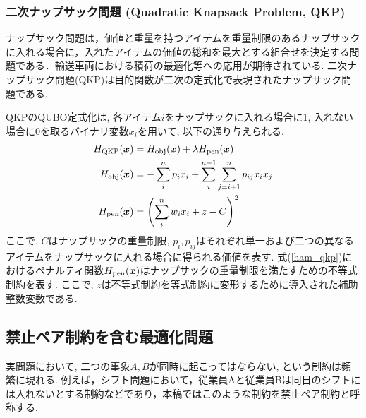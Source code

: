 \documentclass[submit,techrep,noauthor]{ipsj}
\begin{document}
\subsubsection{二次ナップサック問題 (Quadratic Knapsack Problem, QKP)}
ナップサック問題は，価値と重量を持つアイテムを重量制限のあるナップサックに入れる場合に，入れたアイテムの価値の総和を最大とする組合せを決定する問題である．輸送車両における積荷の最適化等への応用が期待されている. 二次ナップサック問題(QKP)は目的関数が二次の定式化で表現されたナップサック問題である. 


QKPのQUBO定式化は, 各アイテム$i$をナップサックに入れる場合に1, 入れない場合に0を取るバイナリ変数$x_{i}$を用いて, 以下の通り与えられる.
\textcolor{blue}{
\begin{align}
H_{\rm{QKP}}(\bm{x}) &= H_{\rm{obj}}(\bm{x}) + \lambda H_{\rm{pen}}(\bm{x})\nonumber\\
H_{\rm{obj}}(\bm{x}) &= -\sum_{i}^{n}p_{i}x_{i}+\sum_{i}^{n-1}\sum_{j=i+1}^{n}p_{ij}x_{i}x_{j}\nonumber\\
H_{\rm{pen}}(\bm{x}) &= \left(\sum_{i}^{n}w_{i}x_{i}+z-C\right)^{2} \label{ham_qkp}
\end{align}
}
ここで, $C$はナップサックの重量制限, $p_{i}, p_{ij}$はそれぞれ単一および二つの異なるアイテムをナップサックに入れる場合に得られる価値を表す. 式(\ref{ham_qkp})におけるペナルティ関数$H_{\rm{pen}}(\bm{x})$はナップサックの重量制限を満たすための不等式制約を表す. ここで, $z$は不等式制約を等式制約に変形するために導入された補助整数変数である.

\subsection{禁止ペア制約を含む最適化問題}
実問題において, 二つの事象$A, B$が同時に起こってはならない, という制約は頻繁に現れる. 例えば，シフト問題において，従業員Aと従業員Bは同日のシフトには入れないとする制約などであり，本稿ではこのような制約を禁止ペア制約と呼称する. 
\end{document}
